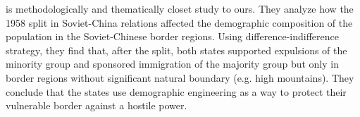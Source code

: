 

\citet{mcnamee_demographic_2019} is methodologically and thematically closet study to ours. They analyze how the 1958 split in Soviet-China relations affected the demographic composition of the population in the Soviet-Chinese border regions.
Using difference-indifference strategy, they find that, after the split,  both states supported expulsions  of the minority group and sponsored immigration of the majority group but only in border regions without significant natural boundary (e.g. high mountains). They conclude that the states use demographic engineering as a way to protect their vulnerable border against a hostile power. 


